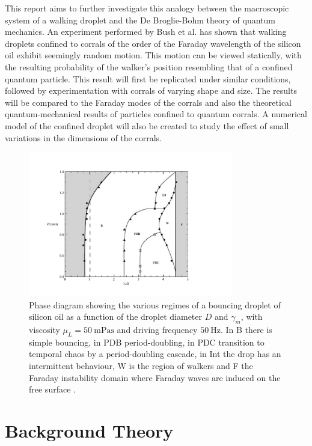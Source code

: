 \documentclass[11pt]{article}
\begin{document}
This report aims to further investigate this analogy between the macroscopic system of a walking droplet and the De Broglie-Bohm theory of quantum mechanics.  An experiment performed by Bush et al.\cite{12} has shown that walking droplets confined to corrals of the order of the Faraday wavelength of the silicon oil exhibit seemingly random motion.  This motion can be viewed statically, with the resulting probability of the walker's position resembling that of a confined quantum particle.  This result will first be replicated under similar conditions, followed by experimentation with corrals of varying shape and size.  The results will be compared to the Faraday modes of the corrals and also the theoretical quantum-mechanical results of particles confined to quantum corrals.  A numerical model of the confined droplet will also be created to study the effect of small variations in the dimensions of the corrals.

\begin{figure}[t]
    \centering
    \includegraphics[trim={25mm 15mm 25mm 15mm},clip,width=0.8\textwidth]{PhaseDiagram.pdf}
    \caption{Phase diagram showing the various regimes of a bouncing droplet of silicon oil as a function of the droplet diameter $D$ and $\gamma_m$, with viscosity $\mu_L=\SI{50}{\milli\pascal\second}$ and driving frequency $\SI{50}{\hertz}$.  In B there is simple bouncing, in PDB period-doubling, in PDC transition to temporal chaos by a period-doubling cascade, in Int the drop has an intermittent behaviour, W is the region of walkers and F the Faraday instability domain where Faraday waves are induced on the free surface \cite{9}.}
    \label{figphasediagram}
\end{figure}

\section{Background Theory}
\label{secbackgroundtheory}
\end{document}
